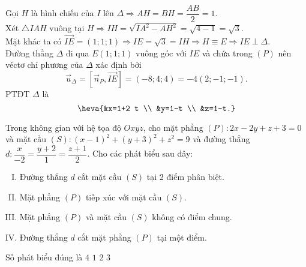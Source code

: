 \begin{ex}
{		Gọi $H$ là hình chiếu của $I$ lên $\Delta \Rightarrow A H=B H=\dfrac{A B}{2}=1$.\\
		Xét $\triangle I A H$ vuông tại $H \Rightarrow I H=\sqrt{I A^2-A H^2}=\sqrt{4-1}=\sqrt{3}$.\\
		Mặt khác ta có $\overrightarrow{I E}=(1; 1; 1) \Rightarrow I E=\sqrt{3}=I H \Rightarrow H \equiv E \Rightarrow I E \perp \Delta$.\\
		Đường thẳng $\Delta$ đi qua $E(1; 1; 1)$ vuông góc với $I E$ và chứa trong $(P)$ nên	véctơ chỉ phương của $\Delta$ xác định bởi $$\overrightarrow{u}_{\Delta}=\left[\overrightarrow{n}_P, \overrightarrow{I E}\right]=(-8; 4; 4)=-4(2;-1;-1).$$
		PTĐT $\Delta$ là $$\heva{&x=1+2 t \\ &y=1-t \\ &z=1-t.}$$	
	}
\end{ex}
\begin{ex}%
	Trong không gian với hệ tọa độ $O x y z$, cho mặt phẳng $(P)\colon 2 x-2 y+z+3=0$ và mặt cầu $(S)\colon(x-1)^2+(y+3)^2+z^2=9$ và đường thẳng $d\colon \dfrac{x}{-2}=\dfrac{y+2}{1}=\dfrac{z+1}{2}$. Cho các phát biểu sau đây:
	\begin{enumerate}[I. ]
		\item Đường thẳng $d$ cắt mặt cầu $(S)$ tại 2 điểm phân biệt.
		\item Mặt phẳng $(P)$ tiếp xúc với mặt cầu $(S)$.
		\item Mặt phẳng $(P)$ và mặt cầu $(S)$ không có điểm chung.
		\item Đường thẳng $d$ cắt mặt phẳng $(P)$ tại một điểm.	
	\end{enumerate}
	Số phát biểu đúng là
	\choice
	{$4$}
	{$1$}
	{$2$}
	{\True $3$}
\end{ex} 

